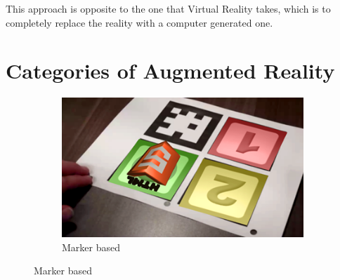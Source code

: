 \documentclass[12 pct]{report}
\begin{document}
This approach is opposite to the one that Virtual Reality takes, which is to completely replace the reality with a computer generated one.

\section{Categories of Augmented Reality}
\begin{figure}[h!]
  \centering
  \begin{subfigure}[b]{0.36\linewidth}
    \includegraphics[width=\linewidth]{marker-based}
     \caption{Marker based}
     

\end{subfigure}
\end{figure}
\end{document}
